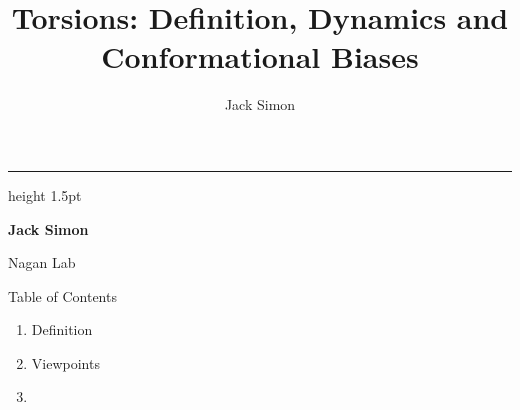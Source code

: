 \documentclass[aspectratio=169,11pt]{beamer}
\title{Torsions: Definition, Dynamics and Conformational Biases}
\author{Jack Simon}
\date{}
\begin{document}

\begin{frame}[plain]
  \vfill
  \centering
  \begin{minipage}{0.88\textwidth}
    \raggedright

    \noindent{}\par
    \vspace{0.4em}

    \noindent{}\par

    \vspace{1.2em}
    {\color{accent!40}\hrule height 1.5pt}
    \vspace{1.2em}

    {\large\bfseries\color{ink} Jack Simon\par}
    \vspace{0.3em}
    {\small\color{ink!80} Nagan Lab\par}

  \end{minipage}
  \vfill
\end{frame}


\begin{frame}{Table of Contents}
  \bfseries
  \begin{enumerate}
    \setlength\itemsep{0.4em}
    \item Definition 
    \item Viewpoints
    \item 
  \end{enumerate}
\end{frame}
\end{document}
